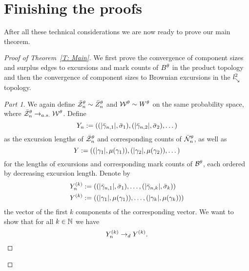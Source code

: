 \section{Finishing the proofs} \label{S: proofs}
After all these technical considerations we are now ready to prove our main theorem.

\begin{proof}[Proof of Theorem~\ref{T: Main}]
	We first prove the convergence of component sizes and surplus edges to excursions and mark counts of $B^{\theta}$ in the product topology
	and then the convergence of component sizes to Brownian excursions in the $\mathit{l}^2_{\searrow}$ topology.
	
	\begin{proof}[Part 1]\renewcommand{\qedsymbol}{}
	We again define $\bar{\mathcal{Z}}^{\theta}_n \sim \bar{Z}^{\theta}_n$ and $\mathcal{W}^{\theta} \sim W^{\theta}$ on the same probability space,
	where $\bar{\mathcal{Z}}^{\theta}_n \rightarrow_{a.s.} \mathcal{W}^{\theta}$.
	Define
	\begin{equation} \label{E: def Yn}
		Y_n := \left((|\bar{\gamma}_{n,1}|, \bar{\sigma}_1), (|\bar{\gamma}_{n,2}|, \bar{\sigma}_2), \dots\right)
	\end{equation}
	as the excursion lengths of $\bar{\mathcal{Z}}^{\theta}_n$ and corresponding counts of $\bar{\mathcal{N}}_n^{\theta}$,
	as well as
	\begin{equation} \label{E: def Y}
		Y := \left((|\gamma_1|, \mu(\gamma_1)), (|\gamma_2|, \mu(\gamma_2)), \dots\right)
	\end{equation}
	for the lengths of excursions and corresponding mark counts of $\mathcal{B}^{\theta}$, each ordered by decreasing excursion length.
	Denote by 
	\begin{equation} \label{E: def Yk Ynk}
		\begin{aligned}
		Y_n^{(k)} &:= \left((|\bar{\gamma}_{n,1}|, \bar{\sigma}_1), \dots, (|\bar{\gamma}_{n,k}|, \bar{\sigma}_k)\right) \\
		Y^{(k)}  &:= \left((|\gamma_1|, \mu(\gamma_1)), \dots, (|\gamma_k|, \mu(\gamma_k))\right)
		\end{aligned}
	\end{equation}
	the vector of the first $k$ components of the corresponding vector.
	We want to show that for all $k \in \mathbb{N}$ we have
	\begin{equation*}
		Y_n^{(k)} \rightarrow_d Y^{(k)}.
	\end{equation*}
	

\end{proof}
\end{proof}
